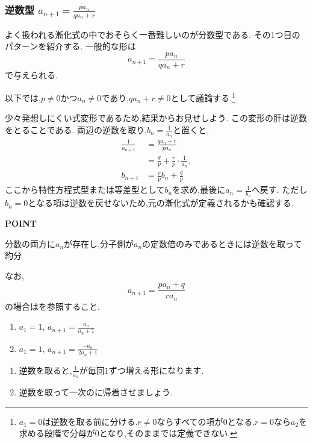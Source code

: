 
\subsubsection{\texorpdfstring{逆数型   $a_{n+1}=\frac{pa_n}{qa_n+r}$}{逆数型}}\label{節：逆数型}
よく扱われる漸化式の中でおそらく一番難しいのが分数型である.
その1つ目のパターンを紹介する.
一般的な形は
\[
  a_{n+1}=\frac{pa_n}{qa_n+r}
\]
で与えられる.

以下では,$p\ne0$かつ$a_n\ne0$であり,$qa_n+r\ne0$として議論する.\footnote{$a_1=0$は逆数を取る前に分ける.$r\ne0$ならすべての項が$0$となる.$r=0$なら$a_2$を求める段階で分母が$0$となり,そのままでは定義できない.}

少々発想しにくい式変形であるため,結果からお見せしよう.
この変形の肝は逆数をとることである.
両辺の逆数を取り,$b_n=\frac{1}{a_n}$と置くと,
\begin{align*}
  \frac{1}{a_{n+1}}&=\frac{qa_n+r}{pa_n}\\
  &=\frac{q}{p}+\frac{r}{p}\cdot\frac{1}{a_n},\\
  b_{n+1}&=\frac{r}{p}b_n+\frac{q}{p}
\end{align*}
ここから特性方程式型または等差型として$b_n$を求め,最後に$a_n=\frac{1}{b_n}$へ戻す.
ただし$b_n=0$となる項は逆数を戻せないため,元の漸化式が定義されるかも確認する.

\begin{bookpoint}
  \textbf{POINT}\par
  分数の両方に$a_n$が存在し,分子側が$a_n$の定数倍のみであるときには逆数を取って約分
\end{bookpoint}

なお,
\[
  a_{n+1}=\frac{pa_n+q}{ra_n}
\]
の場合はを参照すること.

\noindent {}\par\nobreak
\begin{enumerate}[label=(\arabic*),parsep=3pt,format=\bookitemlink{example-reciprocal-1}{problem}{hint}]
  \item $a_1=1,\, a_{n+1}=\frac{a_n}{a_n+1}$
  \item $a_1=1,\, a_{n+1}=\frac{-a_n}{2a_n+1}$
\end{enumerate}

\noindent{}\par\nobreak
\begin{enumerate}[label=(\arabic*),parsep=3pt,format=\bookitemlink{example-reciprocal-1}{hint}{answer}]
  \item 逆数を取ると,$\frac{1}{a_n}$が毎回$1$ずつ増える形になります.
  \item 逆数を取って一次のに帰着させましょう.
\end{enumerate}

